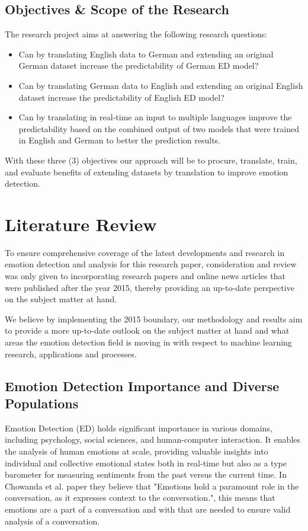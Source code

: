 \documentclass[11pt]{article}
\begin{document}
\subsection{Objectives \& Scope of the Research}

The research project aims at answering the following research questions:

\begin{itemize}
\item Can by translating English data to German and extending an original German dataset increase the predictability of German ED model?
\item Can by translating German data to English and extending an original English dataset increase the predictability of English ED model?
\item Can by translating in real-time an input to multiple languages improve the predictability based on the combined output of two models that were trained in English and German to better the prediction results.
\end{itemize}

With these three (3) objectives our approach will be to procure, translate, train, and evaluate benefits of extending datasets by translation to improve emotion detection. 

\clearpage
\section{Literature Review}
To ensure comprehensive coverage of the latest developments and research in emotion detection and analysis for this research paper, consideration and review was only given to incorporating research papers and online news articles that were published after the year 2015, thereby providing an up-to-date perspective on the subject matter at hand.

We believe by implementing the 2015 boundary, our methodology and results aim to provide a more up-to-date outlook on the subject matter at hand and what areas the emotion detection field is moving in with respect to machine learning research, applications and processes.

\subsection{Emotion Detection Importance and Diverse Populations}
Emotion Detection (ED) holds significant importance in various domains, including psychology, social sciences, and human-computer interaction. It enables the analysis of human emotions at scale, providing valuable insights into individual and collective emotional states both in real-time but also as a type barometer for measuring sentiments from the past versus the current time. In Chowanda et al. paper\cite{CHOWANDA-2021821} they believe that "Emotions hold a paramount role in the conversation, as it expresses context to the conversation.", this means that emotions are a part of a conversation and with that are needed to ensure valid analysis of a conversation.
\end{document}
